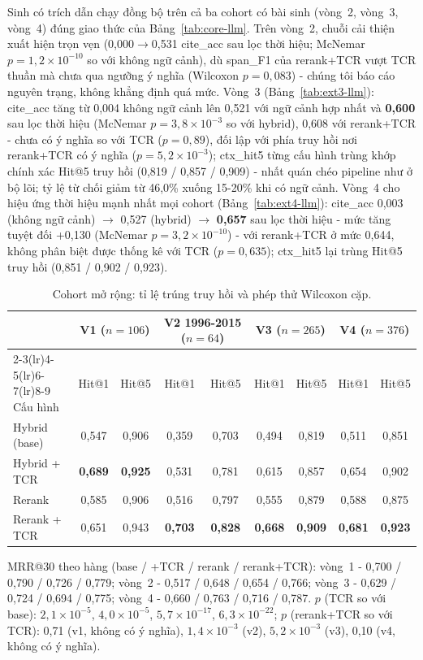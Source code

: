 \documentclass[11pt,a4paper]{article}
\begin{document}
Sinh có trích dẫn chạy đồng bộ trên cả ba cohort có bài sinh (vòng~2, vòng~3, vòng~4) đúng giao thức của Bảng~\ref{tab:core-llm}. Trên vòng~2, chuỗi cải thiện xuất hiện trọn vẹn (0,000$\rightarrow$0,531 cite\_acc sau lọc thời hiệu; McNemar $p=1{,}2\times10^{-10}$ so với không ngữ cảnh), dù span\_F1 của rerank+TCR vượt TCR thuần mà chưa qua ngưỡng ý nghĩa (Wilcoxon $p=0{,}083$) - chúng tôi báo cáo nguyên trạng, không khẳng định quá mức. Vòng~3 (Bảng~\ref{tab:ext3-llm}): cite\_acc tăng từ 0,004 không ngữ cảnh lên 0,521 với ngữ cảnh hợp nhất và \textbf{0,600} sau lọc thời hiệu (McNemar $p=3{,}8\times10^{-3}$ so với hybrid), 0,608 với rerank+TCR - chưa có ý nghĩa so với TCR ($p=0{,}89$), đối lập với phía truy hồi nơi rerank+TCR có ý nghĩa ($p=5{,}2\times10^{-3}$); ctx\_hit5 từng cấu hình trùng khớp chính xác Hit@5 truy hồi (0,819 / 0,857 / 0,909) - nhất quán chéo pipeline như ở bộ lõi; tỷ lệ từ chối giảm từ 46,0\% xuống 15-20\% khi có ngữ cảnh. Vòng~4 cho hiệu ứng thời hiệu mạnh nhất mọi cohort (Bảng~\ref{tab:ext4-llm}): cite\_acc 0,003 (không ngữ cảnh) $\rightarrow$ 0,527 (hybrid) $\rightarrow$ \textbf{0,657} sau lọc thời hiệu - mức tăng tuyệt đối +0,130 (McNemar $p=3{,}2\times10^{-10}$) - với rerank+TCR ở mức 0,644, không phân biệt được thống kê với TCR ($p=0{,}635$); ctx\_hit5 lại trùng Hit@5 truy hồi (0,851 / 0,902 / 0,923).

\begin{table}[t]
\centering\footnotesize
\caption{Cohort mở rộng: tỉ lệ trúng truy hồi và phép thử Wilcoxon cặp.}
\label{tab:ext}
\setlength{\tabcolsep}{3.0pt}
\begin{tabular}{lcccccccc}
\toprule
 & \multicolumn{2}{c}{V1 ($n{=}106$)} & \multicolumn{2}{c}{V2 1996-2015 ($n{=}64$)} & \multicolumn{2}{c}{V3 ($n{=}265$)} & \multicolumn{2}{c}{V4 ($n{=}376$)} \\
\cmidrule(lr){2-3}\cmidrule(lr){4-5}\cmidrule(lr){6-7}\cmidrule(lr){8-9}
Cấu hình & Hit@1 & Hit@5 & Hit@1 & Hit@5 & Hit@1 & Hit@5 & Hit@1 & Hit@5 \\
\midrule
Hybrid (base) & 0,547 & 0,906 & 0,359 & 0,703 & 0,494 & 0,819 & 0,511 & 0,851 \\
Hybrid + TCR & \textbf{0,689} & \textbf{0,925} & 0,531 & 0,781 & 0,615 & 0,857 & 0,654 & 0,902 \\
Rerank & 0,585 & 0,906 & 0,516 & 0,797 & 0,555 & 0,879 & 0,588 & 0,875 \\
Rerank + TCR & 0,651 & 0,943 & \textbf{0,703} & \textbf{0,828} & \textbf{0,668} & \textbf{0,909} & \textbf{0,681} & \textbf{0,923} \\
\bottomrule
\end{tabular}

\vspace{3pt}
{\footnotesize MRR@30 theo hàng (base / +TCR / rerank / rerank+TCR): vòng~1 - 0,700 / 0,790 / 0,726 / 0,779; vòng~2 - 0,517 / 0,648 / 0,654 / 0,766; vòng~3 - 0,629 / 0,724 / 0,694 / 0,775; vòng~4 - 0,660 / 0,763 / 0,716 / 0,787. $p$ (TCR so với base): $2{,}1\times10^{-5}$, $4{,}0\times10^{-5}$, $5{,}7\times10^{-17}$, $6{,}3\times10^{-22}$; $p$ (rerank+TCR so với TCR): 0,71 (v1, không có ý nghĩa), $1{,}4\times10^{-3}$ (v2), $5{,}2\times10^{-3}$ (v3), 0,10 (v4, không có ý nghĩa).}
\end{table}
\end{document}
